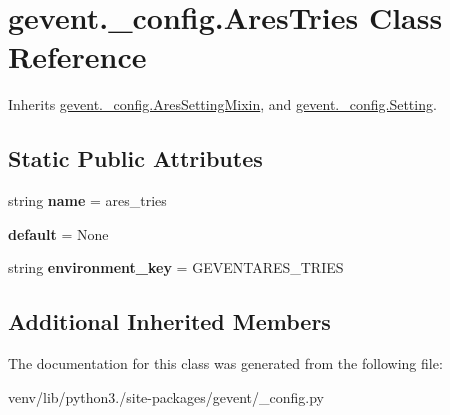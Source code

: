 \hypertarget{classgevent_1_1__config_1_1_ares_tries}{}\section{gevent.\+\_\+config.\+Ares\+Tries Class Reference}
\label{classgevent_1_1__config_1_1_ares_tries}


Inherits \hyperlink{classgevent_1_1__config_1_1_ares_setting_mixin}{gevent.\+\_\+config.\+Ares\+Setting\+Mixin}, and \hyperlink{classgevent_1_1__config_1_1_setting}{gevent.\+\_\+config.\+Setting}.

\subsection*{Static Public Attributes}
\begin{DoxyCompactItemize}
\item 
\mbox{\label{classgevent_1_1__config_1_1_ares_tries_ac3d931ff708c4080c312d7434bf29eb2}} 
string {\bfseries name} = \textquotesingle{}ares\+\_\+tries\textquotesingle{}
\item 
\mbox{\label{classgevent_1_1__config_1_1_ares_tries_a1ac993ef7d290f36a5a1a5b87cc285ab}} 
{\bfseries default} = None
\item 
\mbox{\label{classgevent_1_1__config_1_1_ares_tries_ac435577f89da8863bfb5fc89a175ddae}} 
string {\bfseries environment\+\_\+key} = \textquotesingle{}G\+E\+V\+E\+N\+T\+A\+R\+E\+S\+\_\+\+T\+R\+I\+ES\textquotesingle{}
\end{DoxyCompactItemize}
\subsection*{Additional Inherited Members}


The documentation for this class was generated from the following file\+:\begin{DoxyCompactItemize}
\item 
venv/lib/python3./site-\/packages/gevent/\+\_\+config.\+py\end{DoxyCompactItemize}
